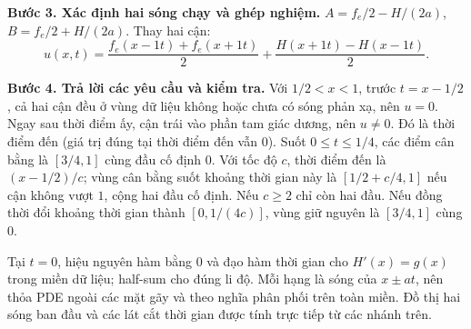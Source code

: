 \textbf{Bước 3. Xác định hai sóng chạy và ghép nghiệm.} $A=f_e/2-H/(2a)$, $B=f_e/2+H/(2a)$. Thay hai cận:
\[u(x,t)=\frac{f_e(x-1t)+f_e(x+1t)}2+\frac{H(x+1t)-H(x-1t)}{2}.\]

\textbf{Bước 4. Trả lời các yêu cầu và kiểm tra.} Với $1/2<x<1$, trước $t=x-1/2$, cả hai cận đều ở vùng dữ liệu không hoặc chưa có sóng phản xạ, nên $u=0$. Ngay sau thời điểm ấy, cận trái vào phần tam giác dương, nên $u\ne0$. Đó là thời điểm đến (giá trị đúng tại thời điểm đến vẫn $0$). Suốt $0\le t\le1/4$, các điểm cân bằng là $[3/4,1]$ cùng đầu cố định $0$. Với tốc độ $c$, thời điểm đến là $(x-1/2)/c$; vùng cân bằng suốt khoảng thời gian này là $[1/2+c/4,1]$ nếu cận không vượt $1$, cộng hai đầu cố định. Nếu $c\ge2$ chỉ còn hai đầu. Nếu đồng thời đổi khoảng thời gian thành $[0,1/(4c)]$, vùng giữ nguyên là $[3/4,1]$ cùng $0$.

Tại $t=0$, hiệu nguyên hàm bằng $0$ và đạo hàm thời gian cho $H'(x)=g(x)$ trong miền dữ liệu; half-sum cho đúng li độ. Mỗi hạng là sóng của $x\pm at$, nên thỏa PDE ngoài các mặt gãy và theo nghĩa phân phối trên toàn miền. Đồ thị hai sóng ban đầu và các lát cắt thời gian được tính trực tiếp từ các nhánh trên.

